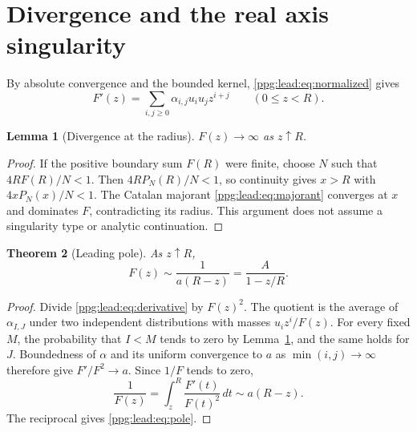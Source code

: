 \documentclass[11pt,letterpaper]{article}
\newtheorem{theorem}{Theorem}[section]
\newtheorem{lemma}[theorem]{Lemma}
\theoremstyle{remark}\newtheorem{remark}[theorem]{Remark}
\numberwithin{equation}{section}
\begin{document}
\section{Divergence and the real axis singularity}\label{ppg:lead:sec:abelian}
By absolute convergence and the bounded kernel, \eqref{ppg:lead:eq:normalized} gives
\begin{equation}\label{ppg:lead:eq:derivative}
 F'(z)=\sum_{i,j\ge0}\alpha_{i,j}u_iu_jz^{i+j}\qquad(0\le z<R).
\end{equation}

\begin{lemma}[Divergence at the radius]\label{ppg:lead:lem:divergence}
$F(z)\to\infty$ as $z\uparrow R$.
\end{lemma}
\begin{proof}
If the positive boundary sum $F(R)$ were finite, choose $N$ such that $4RF(R)/N<1$. Then $4RP_N(R)/N<1$, so continuity gives $x>R$ with $4xP_N(x)/N<1$. The Catalan majorant \eqref{ppg:lead:eq:majorant} converges at $x$ and dominates $F$, contradicting its radius. This argument does not assume a singularity type or analytic continuation.
\end{proof}

\begin{theorem}[Leading pole]\label{ppg:lead:thm:pole}
As $z\uparrow R$,
\begin{equation}\label{ppg:lead:eq:pole}
 F(z)\sim\frac1{a(R-z)}=\frac A{1-z/R}.
\end{equation}
\end{theorem}
\begin{proof}
Divide \eqref{ppg:lead:eq:derivative} by $F(z)^2$. The quotient is the average of $\alpha_{I,J}$ under two independent distributions with masses $u_iz^i/F(z)$. For every fixed $M$, the probability that $I<M$ tends to zero by Lemma~\ref{ppg:lead:lem:divergence}, and the same holds for $J$. Boundedness of $\alpha$ and its uniform convergence to $a$ as $\min(i,j)\to\infty$ therefore give $F'/F^2\to a$. Since $1/F$ tends to zero,
\[
 \frac1{F(z)}=\int_z^R\frac{F'(t)}{F(t)^2}\,dt\sim a(R-z).
\]
The reciprocal gives \eqref{ppg:lead:eq:pole}.
\end{proof}
\end{document}
